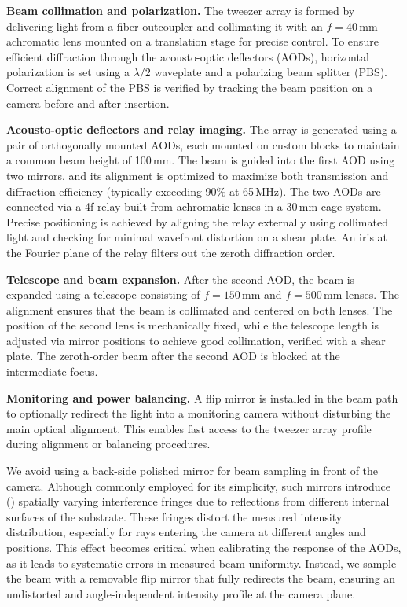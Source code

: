 \textbf{Beam collimation and polarization.} The tweezer array is formed by delivering light from a fiber outcoupler and collimating it with an $f = 40\,\mathrm{mm}$ achromatic lens mounted on a translation stage for precise control. To ensure efficient diffraction through the acousto-optic deflectors (AODs), horizontal polarization is set using a $\lambda/2$ waveplate and a polarizing beam splitter (PBS). Correct alignment of the PBS is verified by tracking the beam position on a camera before and after insertion.

\textbf{Acousto-optic deflectors and relay imaging.} The array is generated using a pair of orthogonally mounted AODs, each mounted on custom blocks to maintain a common beam height of 100\,mm. The beam is guided into the first AOD using two mirrors, and its alignment is optimized to maximize both transmission and diffraction efficiency (typically exceeding 90\% at 65\,MHz). The two AODs are connected via a 4f relay built from achromatic lenses in a 30\,mm cage system. Precise positioning is achieved by aligning the relay externally using collimated light and checking for minimal wavefront distortion on a shear plate. An iris at the Fourier plane of the relay filters out the zeroth diffraction order.

\textbf{Telescope and beam expansion.} After the second AOD, the beam is expanded using a telescope consisting of $f = 150\,\mathrm{mm}$ and $f = 500\,\mathrm{mm}$ lenses. The alignment ensures that the beam is collimated and centered on both lenses. The position of the second lens is mechanically fixed, while the telescope length is adjusted via mirror positions to achieve good collimation, verified with a shear plate. The zeroth-order beam after the second AOD is blocked at the intermediate focus.

\textbf{Monitoring and power balancing.} A flip mirror is installed in the beam path to optionally redirect the light into a monitoring camera without disturbing the main optical alignment. This enables fast access to the tweezer array profile during alignment or balancing procedures.

We avoid using a back-side polished mirror for beam sampling in front of the camera. Although commonly employed for its simplicity, such mirrors introduce () spatially varying interference fringes due to reflections from different internal surfaces of the substrate. These fringes distort the measured intensity distribution, especially for rays entering the camera at different angles and positions. This effect becomes critical when calibrating the response of the AODs, as it leads to systematic errors in measured beam uniformity. Instead, we sample the beam with a removable flip mirror that fully redirects the beam, ensuring an undistorted and angle-independent intensity profile at the camera plane.


